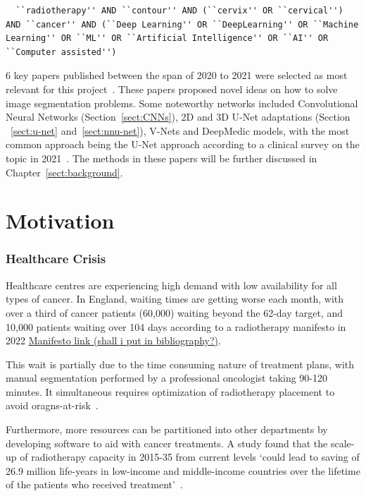 \documentclass[11pt,twoside]{report}
\begin{document}
\begin{lstlisting}
  ``radiotherapy'' AND ``contour'' AND (``cervix'' OR ``cervical'') AND ``cancer'' AND (``Deep Learning'' OR ``DeepLearning'' OR ``Machine Learning'' OR ``ML'' OR ``Artificial Intelligence'' OR ``AI'' OR ``Computer assisted'')  
\end{lstlisting}

6 key papers published between the span of 2020 to 2021 were selected as most relevant for this project~\cite{Samarasinghe2021-ps,Lin2021-oz,Sartor2020-et,LIU2020184,Rhee2020-ms,LIU2020172}. These papers proposed novel ideas on how to solve image segmentation problems. Some noteworthy networks included Convolutional Neural Networks (Section~\ref{sect:CNNs}), 2D and 3D U-Net adaptations (Section ~\ref{sect:u-net} and~\ref{sect:nnu-net}), V-Nets and DeepMedic models, with the most common approach being the U-Net approach according to a clinical survey on the topic in 2021~\cite{Samarasinghe2021-ps}. The methods in these papers will be further discussed in Chapter~\ref{sect:background}.

\section{Motivation}\label{sect:motivation}

\subsubsection{Healthcare Crisis}

Healthcare centres are experiencing high demand with low availability for all types of cancer. In England, waiting times are getting worse each month, with over a third of cancer patients (60,000) waiting beyond the 62-day target, and 10,000 patients waiting over 104 days according to a radiotherapy manifesto in 2022 \href{https://radiotherapy.org.uk/wp-content/uploads/2022/11/APPGRadiotherapy_Manifesto-Update_2022.pdf}{Manifesto link (shall i put in bibliography?)}. 

This wait is partially due to the time consuming nature of treatment plans, with manual segmentation performed by a professional oncologist taking 90-120 minutes\cite{LIU2020184,Sartor2020-et}. It simultaneous requires optimization of radiotherapy placement to avoid oragns-at-risk~\cite{Samarasinghe2021-ps}.

Furthermore, more resources can be partitioned into other departments by developing software to aid with cancer treatments. A study found that the scale-up of radiotherapy capacity in 2015-35 from current levels `could lead to saving of 26.9 million life-years in low-income and middle-income countries over the lifetime of the patients who received treatment'~\cite{expanding-global-access-to-radiotherapy}.
\end{document}
